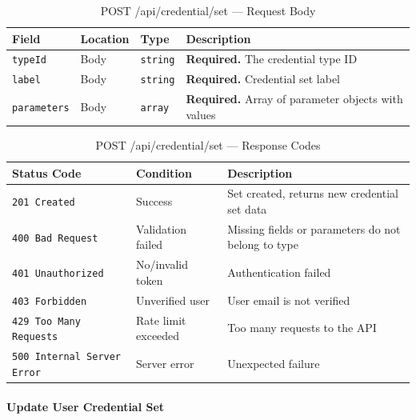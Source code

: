 \begin{table}[H]
\centering
\renewcommand{\arraystretch}{1.3}
\begin{tabularx}{\textwidth}{|l|l|l|X|}
\hline
\textbf{Field} & \textbf{Location} & \textbf{Type} & \textbf{Description} \\
\hline
\texttt{typeId}      & Body & \texttt{string}  & \textbf{Required.} The credential type ID \\
\hline
\texttt{label}       & Body & \texttt{string}  & \textbf{Required.} Credential set label \\
\hline
\texttt{parameters}  & Body & \texttt{array}   & \textbf{Required.} Array of parameter objects with values \\
\hline
\end{tabularx}
\caption{POST /api/credential/set — Request Body}
\label{tab:create-user-credential-set-body}
\end{table}

\begin{table}[H]
\centering
\renewcommand{\arraystretch}{1.3}
\begin{tabularx}{\textwidth}{|l|l|X|}
\hline
\textbf{Status Code} & \textbf{Condition} & \textbf{Description} \\
\hline
\texttt{201 Created}      & Success            & Set created, returns new credential set data \\
\hline
\texttt{400 Bad Request}  & Validation failed  & Missing fields or parameters do not belong to type \\
\hline
\texttt{401 Unauthorized} & No/invalid token   & Authentication failed \\
\hline
\texttt{403 Forbidden}    & Unverified user    & User email is not verified \\
\hline
\texttt{429 Too Many Requests} & Rate limit exceeded & Too many requests to the API \\
\hline
\texttt{500 Internal Server Error} & Server error & Unexpected failure \\
\hline
\end{tabularx}
\caption{POST /api/credential/set — Response Codes}
\label{tab:create-user-credential-set-responses}
\end{table}
\FloatBarrier

\paragraph{Update User Credential Set}
\label{subsubsec:update-user-credential-set}

